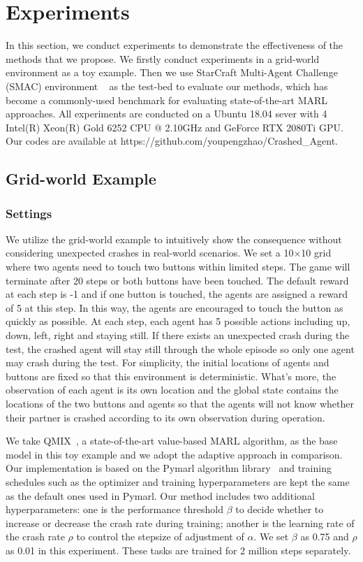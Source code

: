 \documentclass{article}
\begin{document}
\section{Experiments}\label{sec:exp}
In this section, we conduct experiments to demonstrate the effectiveness of the methods that we propose.
We firstly conduct experiments in a grid-world environment as a toy example. Then we use StarCraft Multi-Agent Challenge (SMAC) environment ~\cite{samvelyan19smac} as the test-bed to evaluate our methods, which has become a commonly-used benchmark for evaluating state-of-the-art MARL approaches.
All experiments are conducted on a Ubuntu 18.04 sever with 4 Intel(R) Xeon(R) Gold 6252 CPU @ 2.10GHz and GeForce RTX 2080Ti GPU. Our codes are available at https://github.com/youpengzhao/Crashed\_Agent.

\subsection{Grid-world Example}
\subsubsection{Settings}
We utilize the grid-world example to intuitively show the consequence without considering unexpected crashes in real-world scenarios. We set a 10$\times$10 grid where two agents need to touch two buttons within limited steps. The game will terminate after 20 steps or both buttons have been touched. The default reward at each step is -1 and if one button is touched, the agents are assigned a reward of 5 at this step. In this way, the agents are encouraged to touch the button as quickly as possible. At each step, each agent has 5 possible actions including up, down, left, right and staying still. If there exists an unexpected crash during the test, the crashed agent will stay still through the whole episode so only one agent may crash during the test. For simplicity, the initial locations of agents and buttons are fixed so that this environment is deterministic. What's more, the observation of each agent is its own location and the global state contains the locations of the two buttons and agents so that the agents will not know whether their partner is crashed according to its own observation during operation.

We take QMIX~\cite{rashid2018qmix}, a state-of-the-art value-based MARL algorithm, as the base model in this toy example and we adopt the adaptive approach in comparison. Our implementation is based on the Pymarl algorithm library~\cite{samvelyan19smac} and training schedules such as the optimizer and training hyperparameters are kept the same as the default ones used in Pymarl. Our method includes two additional hyperparameters: one is the performance threshold $\beta$ to decide whether to increase or decrease the crash rate during training; another is the learning rate of the crash rate $\rho$ to control the stepsize of adjustment of $\alpha$. We set $\beta$ as 0.75 and $\rho$ as 0.01 in this experiment. These tasks are trained for 2 million steps separately.
\end{document}
